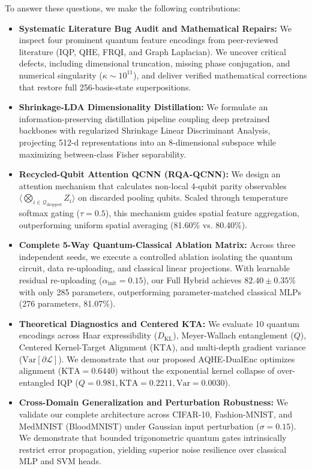 \documentclass[10pt,twocolumn,twoside,a4paper]{article}
\begin{document}
To answer these questions, we make the following contributions:
\begin{itemize}
    \item \textbf{Systematic Literature Bug Audit and Mathematical Repairs:} We inspect four prominent quantum feature encodings from peer-reviewed literature (IQP, QHE, FRQI, and Graph Laplacian). We uncover critical defects, including dimensional truncation, missing phase conjugation, and numerical singularity ($\kappa \sim 10^{11}$), and deliver verified mathematical corrections that restore full 256-basis-state superpositions.
    \item \textbf{Shrinkage-LDA Dimensionality Distillation:} We formulate an information-preserving distillation pipeline coupling deep pretrained backbones with regularized Shrinkage Linear Discriminant Analysis, projecting 512-d representations into an 8-dimensional subspace while maximizing between-class Fisher separability.
    \item \textbf{Recycled-Qubit Attention QCNN (RQA-QCNN):} We design an attention mechanism that calculates non-local 4-qubit parity observables $\langle \bigotimes_{i \in \mathcal{Q}_{\text{dropped}}} Z_i \rangle$ on discarded pooling qubits. Scaled through temperature softmax gating ($\tau=0.5$), this mechanism guides spatial feature aggregation, outperforming uniform spatial averaging (81.60\% vs. 80.40\%).
    \item \textbf{Complete 5-Way Quantum-Classical Ablation Matrix:} Across three independent seeds, we execute a controlled ablation isolating the quantum circuit, data re-uploading, and classical linear projections. With learnable residual re-uploading ($\alpha_{\text{init}} = 0.15$), our Full Hybrid achieves $82.40 \pm 0.35$\% with only 285 parameters, outperforming parameter-matched classical MLPs (276 parameters, 81.07\%).
    \item \textbf{Theoretical Diagnostics and Centered KTA:} We evaluate 10 quantum encodings across Haar expressibility ($D_{\text{KL}}$), Meyer-Wallach entanglement ($Q$), Centered Kernel-Target Alignment ($\text{KTA}$), and multi-depth gradient variance ($\text{Var}[\partial \mathcal{L}]$). We demonstrate that our proposed AQHE-DualEnc optimizes alignment ($\text{KTA}=0.6440$) without the exponential kernel collapse of over-entangled IQP ($Q=0.981, \text{KTA}=0.2211, \text{Var}=0.0030$).
    \item \textbf{Cross-Domain Generalization and Perturbation Robustness:} We validate our complete architecture across CIFAR-10, Fashion-MNIST, and MedMNIST (BloodMNIST) under Gaussian input perturbation ($\sigma=0.15$). We demonstrate that bounded trigonometric quantum gates intrinsically restrict error propagation, yielding superior noise resilience over classical MLP and SVM heads.
\end{itemize}
\end{document}

